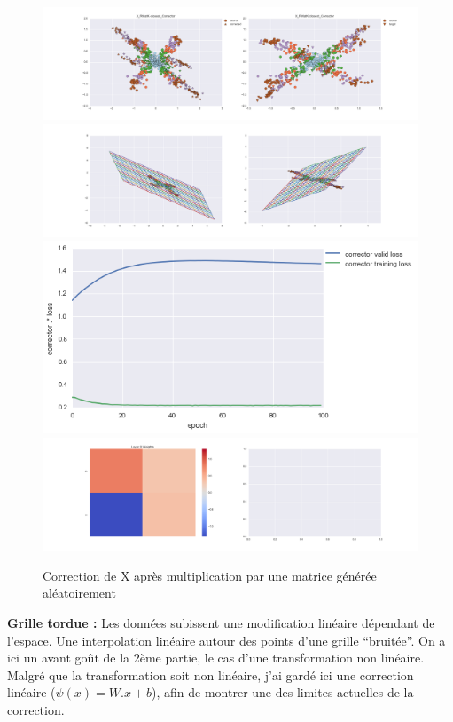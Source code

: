 \begin{figure}[H] %
\centering
\includegraphics[width=\linewidth]{fig/24-05-2016/X/X_RMatK-closest_Corrector-DATA.png}
\includegraphics[width=\linewidth]{fig/24-05-2016/X/X_RMatK-closest_Corrector-GridCheck.png}
\includegraphics[width=0.45\linewidth]{fig/24-05-2016/X/X_RMatK-closest_Corrector-Learning_curve.png}
\includegraphics[width=\linewidth]{fig/24-05-2016/X/X_RMatK-closest_Corrector-W.png}
\caption{Correction de X après multiplication par une matrice générée aléatoirement}
\label{fig:recap-X-RMat-exhaustive}
\end{figure}

{\Large \textbf{Grille tordue :}} Les données subissent une modification linéaire dépendant de l'espace.
Une interpolation linéaire autour des points d'une grille ``bruitée''.
On a ici un avant goût de la 2ème partie, le cas d'une transformation non linéaire.
Malgré que la transformation soit non linéaire, j'ai gardé ici une correction linéaire ($\psi(x) = W.x+b$),
afin de montrer une des limites actuelles de la correction.

